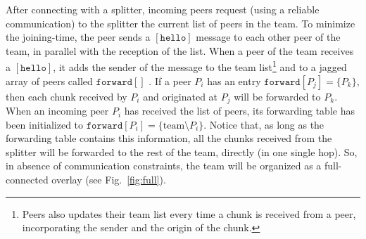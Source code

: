 

\label{sec:joining}

After connecting with a splitter, incoming peers request (using a
reliable communication) to the splitter the current list of peers in
the team. To minimize the \gls{joining-time}, the peer sends a
$[\mathtt{hello}]$ message to each other peer of the team, in parallel
with the reception of the list. When a peer of the team receives a
$[\mathtt{hello}]$, it adds the sender of the message to the team
list\footnote{Peers also updates their team list every time a chunk is
  received from a peer, incorporating the sender and the origin of the
  chunk.} and to a jagged array of peers called $\mathtt{forward}[]$
. If a peer $P_i$ has an entry
$\mathtt{forward}[P_j]=\{P_k\}$, then each chunk received by $P_i$ and
originated at $P_j$ will be forwarded to $P_k$. When an incoming peer
$P_i$ has received the list of peers, its forwarding table has been
initialized to $\mathtt{forward}[P_i]=\{\text{team}\setminus
P_i\}$. Notice that, as long as the forwarding table contains this
information, all the chunks received from the splitter will be
forwarded to the rest of the team, directly (in one single hop). So,
in absence of communication constraints, the team will be organized as
a full-connected overlay (see Fig.~\ref{fig:full}).

